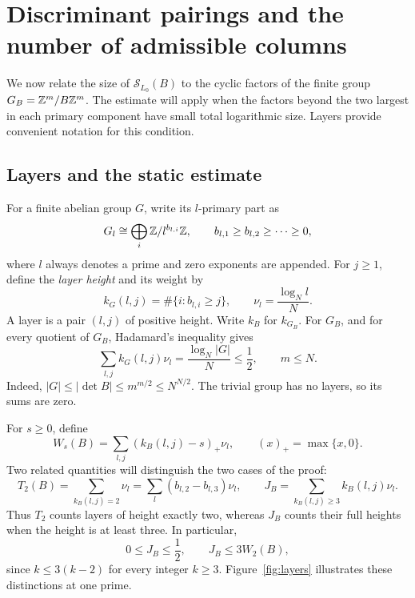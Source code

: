 \section{Discriminant pairings and the number of admissible columns}
\label{sec:pairings}

We now relate the size of \(\mathcal S_{L_0}(B)\) to the cyclic
factors of the finite group \(G_B=\mathbb Z^m/B\mathbb Z^m\). The estimate
will apply when the factors beyond the two largest in each primary
component have small total logarithmic size. Layers provide convenient
notation for this condition.

\subsection{Layers and the static estimate}

For a finite abelian group \(G\), write its \(l\)-primary part as
\[
 G_l\cong\bigoplus_i\mathbb Z/l^{b_{l,i}}\mathbb Z,
 \qquad b_{l,1}\ge b_{l,2}\ge\cdots\ge0,
\]
where \(l\) always denotes a prime and zero exponents are appended.
For \(j\ge1\), define the \emph{layer height} and its weight by
\[
 k_G(l,j)=\#\{i:b_{l,i}\ge j\},
 \qquad \nu_l=\frac{\log_N l}{N}.
\]
A layer is a pair \((l,j)\) of positive height. Write \(k_B\) for
\(k_{G_B}\). For \(G_B\), and for every quotient of \(G_B\),
Hadamard's inequality gives
\begin{equation}\label{eq:group-order}
 \sum_{l,j}k_G(l,j)\nu_l
 =\frac{\log_N|G|}{N}\le\frac12,
 \qquad m\le N.
\end{equation}
Indeed, \(|G|\le|\det B|\le m^{m/2}\le N^{N/2}\).
The trivial group has no layers, so its sums are zero.

For \(s\ge0\), define
\begin{equation}\label{eq:tail-potential}
 W_s(B)=\sum_{l,j}(k_B(l,j)-s)_+\nu_l,
 \qquad (x)_+=\max\{x,0\}.
\end{equation}
Two related quantities will distinguish the two cases of the proof:
\begin{equation}\label{eq:pairing-weights}
 T_2(B)=\sum_{k_B(l,j)=2}\nu_l
       =\sum_l(b_{l,2}-b_{l,3})\nu_l,
 \qquad
 J_B=\sum_{k_B(l,j)\ge3}k_B(l,j)\nu_l.
\end{equation}
Thus \(T_2\) counts layers of height exactly two, whereas \(J_B\)
counts their full heights when the height is at least three.
In particular,
\begin{equation}\label{eq:pairing-high-tail}
 0\le J_B\le\frac12,
 \qquad J_B\le3W_2(B),
\end{equation}
since \(k\le3(k-2)\) for every integer \(k\ge3\).
Figure~\ref{fig:layers} illustrates these distinctions at one prime.

